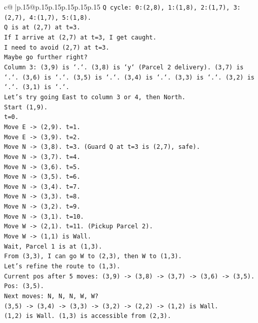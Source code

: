 \documentclass{article}
\begin{document}
{\begin{supertabular}{c@{$\;$}|p{.15\linewidth}@{}p{.15\linewidth}p{.15\linewidth}p{.15\linewidth}p{.15\linewidth}p{.15\linewidth}}
{{{\texttt{Q cycle: 0:(2,8), 1:(1,8), 2:(1,7), 3:(2,7), 4:(1,7), 5:(1,8).} \\
\texttt{Q is at (2,7) at t=3.} \\
\texttt{If I arrive at (2,7) at t=3, I get caught.} \\
\texttt{I need to avoid (2,7) at t=3.} \\
\texttt{Maybe go further right?} \\
\texttt{Column 3: (3,9) is `.`. (3,8) is `y` (Parcel 2 delivery). (3,7) is `.`. (3,6) is `.`. (3,5) is `.`. (3,4) is `.`. (3,3) is `.`. (3,2) is `.`. (3,1) is `.`.} \\
\texttt{Let's try going East to column 3 or 4, then North.} \\
\texttt{Start (1,9).} \\
\texttt{t=0.} \\
\texttt{Move E {-}> (2,9). t=1.} \\
\texttt{Move E {-}> (3,9). t=2.} \\
\texttt{Move N {-}> (3,8). t=3. (Guard Q at t=3 is (2,7), safe).} \\
\texttt{Move N {-}> (3,7). t=4.} \\
\texttt{Move N {-}> (3,6). t=5.} \\
\texttt{Move N {-}> (3,5). t=6.} \\
\texttt{Move N {-}> (3,4). t=7.} \\
\texttt{Move N {-}> (3,3). t=8.} \\
\texttt{Move N {-}> (3,2). t=9.} \\
\texttt{Move N {-}> (3,1). t=10.} \\
\texttt{Move W {-}> (2,1). t=11. (Pickup Parcel 2).} \\
\texttt{Move W {-}> (1,1) is Wall.} \\
\texttt{Wait, Parcel 1 is at (1,3).} \\
\texttt{From (3,3), I can go W to (2,3), then W to (1,3).} \\
\texttt{Let's refine the route to (1,3).} \\
\texttt{Current pos after 5 moves: (3,9) {-}> (3,8) {-}> (3,7) {-}> (3,6) {-}> (3,5).} \\
\texttt{Pos: (3,5).} \\
\texttt{Next moves: N, N, N, W, W?} \\
\texttt{(3,5) {-}> (3,4) {-}> (3,3) {-}> (3,2) {-}> (2,2) {-}> (1,2) is Wall.} \\
\texttt{(1,2) is Wall. (1,3) is accessible from (2,3).} \\
}}}
\end{supertabular}}
\end{document}
